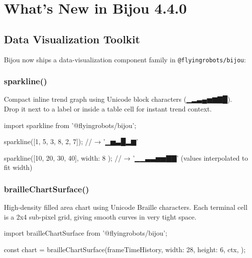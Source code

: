 \chapter{What's New in Bijou 4.4.0}\label{record-278}

\smallskip

\section{Data Visualization Toolkit}\label{record-278-data-visualization-toolkit}

Bijou now ships a data-visualization component family in \texttt{@\allowbreak{}f\allowbreak{}l\allowbreak{}y\allowbreak{}i\allowbreak{}n\allowbreak{}g\allowbreak{}r\allowbreak{}o\allowbreak{}b\allowbreak{}o\allowbreak{}t\allowbreak{}s\allowbreak{}/\allowbreak{}b\allowbreak{}i\allowbreak{}j\allowbreak{}o\allowbreak{}u}:

\subsection{sparkline()}\label{record-278-sparkline}

Compact inline trend graph using Unicode block characters (▁▂▃▄▅▆▇█). Drop it next to a label or inside a table cell for instant trend context.

\begin{CodeBlock}
import { sparkline } from '@flyingrobots/bijou';

sparkline([1, 5, 3, 8, 2, 7]);
// → '▁▅▃█▂▆'

sparkline([10, 20, 30, 40], { width: 8 });
// → '▁▁▃▃▅▅▇▇'  (values interpolated to fit width)
\end{CodeBlock}

\subsection{brailleChartSurface()}\label{record-278-braillechartsurface}

High-density filled area chart using Unicode Braille characters. Each terminal cell is a 2x4 sub-pixel grid, giving smooth curves in very tight space.

\begin{CodeBlock}
import { brailleChartSurface } from '@flyingrobots/bijou';

const chart = brailleChartSurface(frameTimeHistory, {
  width: 28,
  height: 6,
  ctx,
});
\end{CodeBlock}

